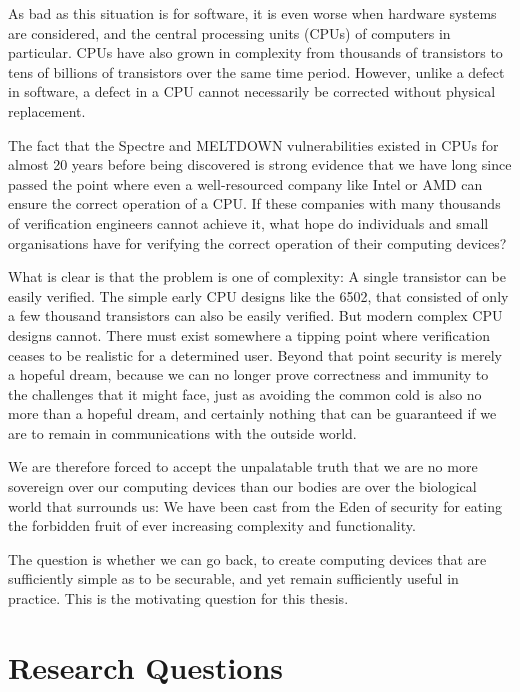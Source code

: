 As bad as this situation is for software, it is even worse when hardware systems are considered, and the central processing units
(CPUs) of computers in particular.  CPUs have also grown in complexity from thousands of transistors to tens of billions of transistors
over the same time period.  However, unlike a defect in software, a defect in a CPU cannot necessarily be corrected without physical
replacement.

The fact that the Spectre and MELTDOWN vulnerabilities existed in CPUs for almost 20 years before being discovered 
is strong evidence that we have long since passed the point where even a well-resourced company like Intel or AMD can ensure
the correct operation of a CPU.  If these companies with many thousands of verification engineers cannot achieve it,
what hope do individuals and small organisations have for verifying the correct operation of their computing devices?

What is clear is that the problem is one of complexity: A single transistor can be easily verified. The simple early CPU designs
like the 6502, that consisted of only a few thousand transistors can also be easily verified.  But modern complex CPU designs cannot.
There must exist somewhere a tipping point where verification ceases to be realistic for a determined user.
Beyond that point security is merely a hopeful dream, because we can no longer prove correctness and immunity to the challenges
that it might face, just as avoiding the common cold is also no more than a hopeful dream, and certainly nothing that can
be guaranteed if we are to remain in communications with the outside world.

We are therefore forced to accept the unpalatable truth that we are no more sovereign over our computing devices than our bodies
are over the biological world that surrounds us: We have been cast from the Eden of security for eating the forbidden fruit of
ever increasing complexity and functionality.

The question is whether we can go back, to create computing devices that are sufficiently simple as to be securable, and yet
remain sufficiently useful in practice.  This is the motivating question for this thesis.

\section{Research Questions}

\label{Ch1 Sec2}

